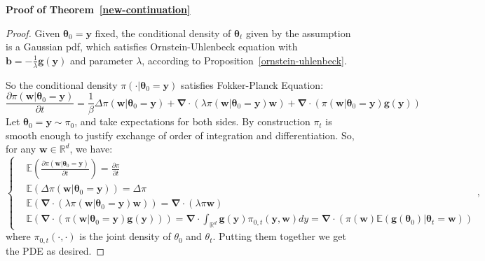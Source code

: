 \documentclass[final,12pt]{colt2018} %
\begin{document}
\noindent \textbf{Proof of Theorem~\ref{new-continuation}}
\begin{proof}
Given $\bm{\theta}_0=\bm{y}$ fixed, the conditional density of $\bm{\theta}_t$ given by the assumption is a Gaussian pdf, which satisfies Ornstein-Uhlenbeck equation with $\bm{b}=-\frac{1}{\lambda}\bm{g}(\bm{y})$ and parameter $\lambda$, according to Proposition~\ref{ornstein-uhlenbeck}.

So the conditional density $\pi(\cdot|\bm{\theta}_0=\bm{y})$ satisfies Fokker-Planck Equation:
\begin{equation}
\frac{\partial\pi(\bm{w}|\bm{\theta}_0=\bm{y})}{\partial t}=\frac{1}{\beta}\Delta \pi(\bm{w}|\bm{\theta}_0=\bm{y})+\bm{\nabla}\cdot(\lambda \pi(\bm{w}|\bm{\theta}_0=\bm{y}) \bm{w})+\bm{\nabla}\cdot \left(\pi(\bm{w}|\bm{\theta}_0=\bm{y})\bm{g}(\bm{y})\right)
\end{equation}
 Let $\bm{\theta}_0=\bm{y}\sim \pi_0$, and take expectations for both sides. By construction $\pi_t$ is smooth enough to justify exchange of order of integration and differentiation. So, for any $\bm{w}\in \mathbb{R}^d$, we have:
 \begin{equation}
 	\left\{
 	\begin{aligned}
 	&\mathbb{E}\left(
\frac{\partial\pi(\bm{w}|\bm{\theta}_0=\bm{y})}{\partial t}\right)=\frac{\partial \pi}{\partial t}\\
&\mathbb{E}\left(\Delta\pi(\bm{w}|\bm{\theta}_0=\bm{y})\right)=\Delta\pi\\
&\mathbb{E}\left(\bm{\nabla}\cdot(\lambda \pi(\bm{w}|\bm{\theta}_0=\bm{y}) \bm{w})\right)=\bm{\nabla}\cdot(\lambda \pi \bm{w})\\
&\mathbb{E}\left(\bm{\nabla}\cdot \left(\pi(\bm{w}|\bm{\theta}_0=\bm{y})\bm{g}(\bm{y})\right)\right)=\bm{\nabla}\cdot\int_{\mathbb{R}^d}\bm{g}(\bm{y})\pi_{0,t}(\bm{y},\bm{w})dy=\bm{\nabla}\cdot \left(\pi(\bm{w})\mathbb{E}(\bm{g}(\bm{\theta}_0)|\bm{\theta}_t=\bm{w})\right)
 	\end{aligned}
 	\right.
 	,
 \end{equation}
 where $\pi_{0,t}(\cdot,\cdot)$ is the joint density of $\theta_0$ and $\theta_t$. Putting them together we get the PDE as desired.
\end{proof}
\end{document}
